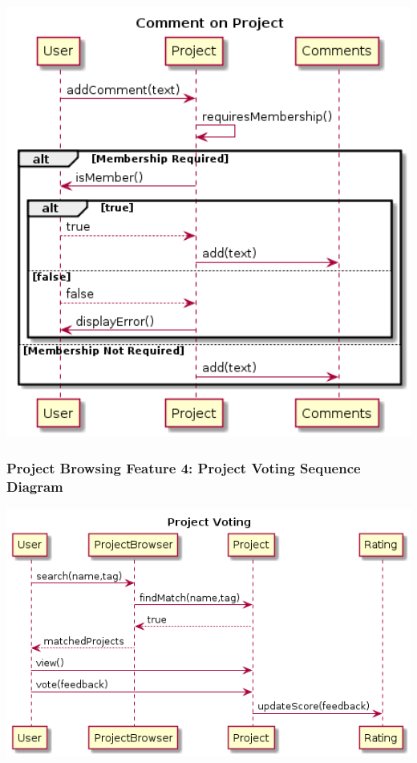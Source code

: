 \documentclass[twoside,letterpaper]{article}
\begin{document}
	\includegraphics[width=6.0in]{images/SequenceDiagrams/ProjectBrowsingProjectCommenting}
	
	\newpage
	
	
	\subsubsection[Project Browsing Feature 4: Project Voting Sequence Diagram]{\rmfamily\bfseries\color{black}
		Project Browsing Feature 4: Project Voting Sequence Diagram}
	\hypertarget{RefHeading22059017292}{}
	
	\bigskip
	
	\includegraphics[width=6.0in]{images/SequenceDiagrams/ProjectBrowsingProjectVoting}
	
\end{document}

